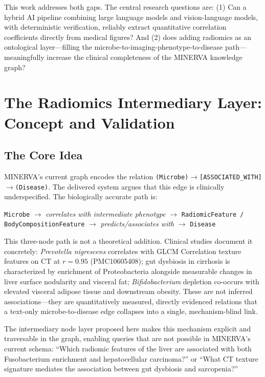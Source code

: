 \documentclass[12pt, letterpaper]{article}
\begin{document}
This work addresses both gaps. The central research questions are: (1) Can a hybrid AI pipeline combining large language models and vision-language models, with deterministic verification, reliably extract quantitative correlation coefficients directly from medical figures? And (2) does adding radiomics as an ontological layer---filling the microbe-to-imaging-phenotype-to-disease path---meaningfully increase the clinical completeness of the MINERVA knowledge graph?

\section{The Radiomics Intermediary Layer: Concept and Validation}

\subsection{The Core Idea}

MINERVA's current graph encodes the relation \texttt{(Microbe)$\to$[ASSOCIATED\_WITH]$\to$(Disease)}. The delivered system argues that this edge is clinically underspecified. The biologically accurate path is:

\begin{center}
\texttt{Microbe} $\to$ \textit{correlates with intermediate phenotype} $\to$ \texttt{RadiomicFeature / BodyCompositionFeature} $\to$ \textit{predicts/associates with} $\to$ \texttt{Disease}
\end{center}

This three-node path is not a theoretical addition. Clinical studies document it concretely: \textit{Prevotella nigrescens} correlates with GLCM Correlation texture features on CT at $r = 0.95$ (PMC10605408); gut dysbiosis in cirrhosis is characterized by enrichment of Proteobacteria alongside measurable changes in liver surface nodularity and visceral fat; \textit{Bifidobacterium} depletion co-occurs with elevated visceral adipose tissue and downstream obesity. These are not inferred associations—they are quantitatively measured, directly evidenced relations that a text-only microbe-to-disease edge collapses into a single, mechanism-blind link.

The intermediary node layer proposed here makes this mechanism explicit and traversable in the graph, enabling queries that are not possible in MINERVA's current schema: ``Which radiomic features of the liver are associated with both Fusobacterium enrichment and hepatocellular carcinoma?'' or ``What CT texture signature mediates the association between gut dysbiosis and sarcopenia?''
\end{document}
